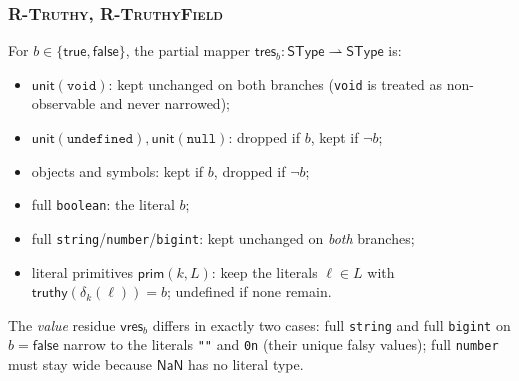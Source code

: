 \documentclass[11pt]{article}
\newcommand{\SType}{\mathsf{SType}}
\begin{document}
\subsubsection{\textsc{R-Truthy}, \textsc{R-TruthyField}}
\label{sec:truthiness}

\begin{definition}
\label{def:residue}
For $b \in \{\mathsf{true},\mathsf{false}\}$, the partial mapper
$\mathsf{tres}_b : \SType \rightharpoonup \SType$ is:
\begin{itemize}
\item $\mathsf{unit}(\texttt{void})$: kept unchanged on both branches
  (\texttt{void} is treated as non-observable and never narrowed);
\item $\mathsf{unit}(\texttt{undefined}), \mathsf{unit}(\texttt{null})$:
  dropped if $b$, kept if $\neg b$;
\item objects and symbols: kept if $b$, dropped if $\neg b$;
\item full \texttt{boolean}: the literal $b$;
\item full \texttt{string}/\texttt{number}/\texttt{bigint}: kept unchanged
  on \emph{both} branches;
\item literal primitives $\mathsf{prim}(k, L)$: keep the literals
  $\ell \in L$ with $\mathsf{truthy}(\delta_k(\ell)) = b$; undefined if none
  remain.
\end{itemize}
The \emph{value} residue $\mathsf{vres}_b$ differs in exactly two cases:
full \texttt{string} and full \texttt{bigint} on $b = \mathsf{false}$ narrow
to the literals \texttt{""} and \texttt{0n} (their unique falsy values);
full \texttt{number} must stay wide because $\mathsf{NaN}$ has no literal
type.
\end{definition}
\end{document}
